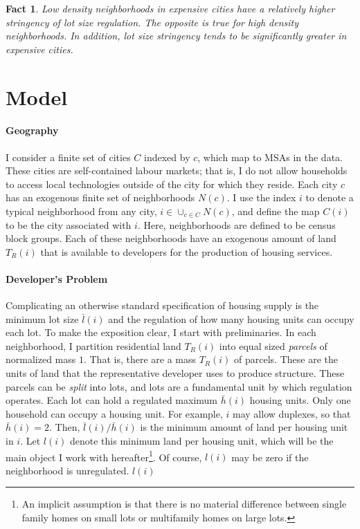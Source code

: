 \documentclass[]{article}
\newtheorem{theorem}{Fact}
\begin{document}
\begin{theorem}\label{Fact3}
	Low density neighborhoods in expensive cities have a relatively higher stringency of lot size regulation. The opposite is true for high density neighborhoods. In addition, lot size stringency tends to be significantly greater in expensive cities. 
\end{theorem}


\section{Model}\label{section:Model}
\paragraph*{Geography}
I consider a finite set of cities $C$ indexed by $c$, which map to MSAs in the data. These cities are self-contained labour markets; that is, I do not allow households to access local technologies outside of the city for which they reside. Each city $c$ has an exogenous finite set of neighborhoods $N(c)$. I use the index $i$ to denote a typical neighborhood from any city, $i \in \cup_{c \in C}N(c)$, and define the map $C(i)$ to be the city associated with $i$. Here, neighborhoods are defined to be census block groups. Each of these neighborhoods have an exogenous amount of land $T_{R}(i)$ that is available to developers for the production of housing services.

\paragraph*{Developer's Problem}   
Complicating an otherwise standard specification of housing supply is the minimum lot size $\bar{l}(i)$ and the regulation of how many housing units can occupy each lot. To make the exposition clear, I start with preliminaries. In each neighborhood, I partition residential land $T_{R}(i)$ into equal sized \textit{parcels} of normalized mass $1$. That is, there are a mass $T_{R}(i)$ of parcels. These are the units of land that the representative developer uses to produce structure. These parcels can be \textit{split} into lots, and lots are a fundamental unit by which regulation operates. Each lot can hold a regulated maximum $\bar{h}(i)$ housing units. Only one household can occupy a housing unit. For example, $i$ may allow duplexes, so that $\bar{h}(i) = 2$. Then, $\bar{l}(i)/\bar{h}(i)$ is the minimum amount of land per housing unit in $i$. Let $l(i)$ denote this minimum land per housing unit, which will be the main object I work with hereafter\footnote{An implicit assumption is that there is no material difference between single family homes on small lots or multifamily homes on large lots.}. Of course, $l(i)$ may be zero if the neighborhood is unregulated. $l(i)$ 
\end{document}
